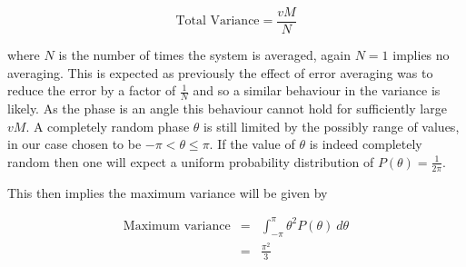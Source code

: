 \documentclass[aps,pra,twocolumn,superscriptaddress,numerical]{revtex4-1}
\begin{document}
		\begin{equation}
		\textrm{Total Variance}=\frac{vM}{N}\label{eq:Tot Var w/ correction}
		\end{equation}
		
		
		where $N$ is the number of times the system is averaged, again $N=1$ implies no averaging. This is expected as previously the effect of error averaging was to reduce the error by a factor of $\frac{1}{N}$ and so a similar behaviour in the variance is likely. As the phase is an angle this behaviour cannot hold for sufficiently large $vM$. A completely random phase $\theta$ is still limited by the possibly range of values, in our case chosen to be $-\pi<\theta\le\pi$. If the value of $\theta$ is indeed completely random then one will expect a uniform probability distribution of $P\left(\theta\right)=\frac{1}{2\pi}$. 
		
		This then implies the maximum variance will be given by
		
		\begin{eqnarray}
		\textrm{Maximum variance} & = & \int_{-\pi}^{\pi}\theta^{2}P\left(\theta\right)\ d\theta\nonumber \\
		& = & \frac{\pi^{2}}{3}\label{eq:Max Var}
		\end{eqnarray}
		
\end{document}
